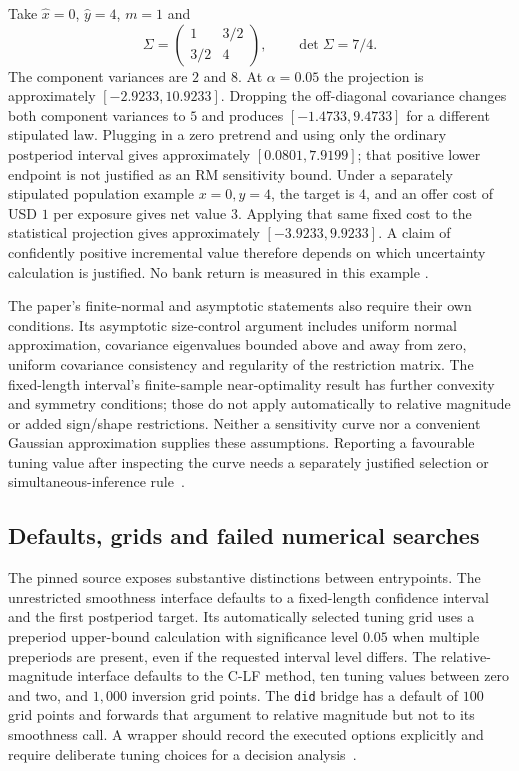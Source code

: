 Take $\widehat x=0$, $\widehat y=4$, $m=1$ and
\begin{equation}
 \Sigma=\begin{pmatrix}1&3/2\\3/2&4\end{pmatrix},
 \qquad \det\Sigma=7/4.
 \label{exec22:hd-example}
\end{equation}
The component variances are $2$ and $8$. At $\alpha=0.05$ the projection is
approximately $[-2.9233,10.9233]$. Dropping the off-diagonal covariance changes
both component variances to $5$ and produces $[-1.4733,9.4733]$ for a different
stipulated law. Plugging in a zero pretrend and using only the ordinary
postperiod interval gives approximately $[0.0801,7.9199]$; that positive lower
endpoint is not justified as an RM sensitivity bound. Under a separately
stipulated population example $x=0,y=4$, the target is $4$, and an offer cost
of USD $1$ per exposure gives net value $3$. Applying that same fixed cost
to the statistical projection gives approximately $[-3.9233,9.9233]$.
A claim of confidently positive incremental value therefore depends on which
uncertainty calculation is justified. No bank return is measured in this example
\citep{exec22_honestdid_reference}.

The paper's finite-normal and asymptotic statements also require their own
conditions. Its asymptotic size-control argument includes uniform normal
approximation, covariance eigenvalues bounded above and away from zero,
uniform covariance consistency and regularity of the restriction matrix.
The fixed-length interval's finite-sample near-optimality result has further
convexity and symmetry conditions; those do not apply automatically to relative
magnitude or added sign/shape restrictions. Neither a sensitivity curve nor
a convenient Gaussian approximation supplies these assumptions. Reporting a
favourable tuning value after inspecting the curve needs a separately justified
selection or simultaneous-inference rule~\citep{rambachan2023}.

\subsection{Defaults, grids and failed numerical searches}
\label{exec22:hd-numerics}

The pinned source exposes substantive distinctions between entrypoints.
The unrestricted smoothness interface defaults to a fixed-length confidence
interval and the first postperiod target. Its automatically selected tuning
grid uses a preperiod upper-bound calculation with significance level $0.05$
when multiple preperiods are present, even if the requested interval level
differs. The relative-magnitude interface defaults to the C-LF method,
ten tuning values between zero and two, and $1{,}000$ inversion grid points.
The \texttt{did} bridge has a default of $100$ grid points and forwards that
argument to relative magnitude but not to its smoothness call. A wrapper should
record the executed options explicitly and require deliberate tuning choices
for a decision analysis~\citep{exec22_honestdid_engine,exec22_honestdid_bridges}.

